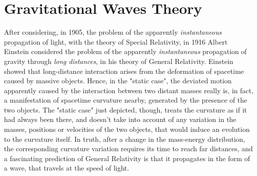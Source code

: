 \chapter{Gravitational Waves Theory}
After considering, in 1905, the problem of the apparently \textit{instantaneous} propagation of light, with the theory of Special Relativity, in 1916 Albert Einstein considered the problem of the apparently \textit{instantaneous} propagation of gravity through \textit{long distances}, in his theory of General Relativity.
Einstein showed that long-distance interaction arises from the deformation of spacetime caused by massive objects.
Hence, in the "static case", the deviated motion apparently caused by the interaction between two distant masses really is, in fact, a manifestation of spacetime curvature nearby, generated by the presence of the two objects.
The "static case" just depicted, though, treats the curvature as if it had always been there, and doesn't take into account of any variation in the masses, positions or velocities of the two objects, that would induce an evolution to the curvature itself.
In truth, after a change in the mass-energy distribution, the corresponding curvature variation requires its time to reach far distances, and a fascinating prediction of General Relativity is that it propagates in the form of a wave, that travels at the speed of light.


